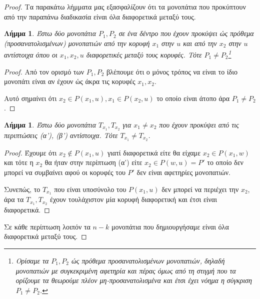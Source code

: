 \documentclass[a4paper, oneside, 11pt]{article}
\newtheorem{lm}[thm]{Λήμμα}
\begin{document}
\begin{enumerate}
\begin{proof}
      Τα παρακάτω λήμματα μας εξασφαλίζουν ότι τα μονοπάτια που προκύπτουν
      από την παραπάνω διαδικασία είναι όλα διαφορετικά μεταξύ τους.

      \begin{lm}
         Έστω δύο μονοπάτια $P_1, P_2$ σε ένα δέντρο που έχουν προκύψει ώς
         πρόθεμα (προσανατολισμένων) μονοπατιών από την κορυφή $x_1$ στην $u$ και
         από την $x_2$ στην $u$ αντίστοιχα όπου οι $x_1, x_2, u$ διαφορετικές
         μεταξύ τους κορυφές. Τότε $P_1 \neq P_2$\footnote{Ορίσαμε τα $P_1, P_2$
         ώς πρόθεμα προσανατολισμένων μονοπατιών, δηλαδή μονοπατιών
         με συγκεκριμένη αφετηρία και πέρας όμως από τη στιγμή που τα ορίζουμε
         τα θεωρούμε πλέον μη-προσανατολισμένα και έτσι έχει νόημα η σύγκριση
         $P_1 \neq P_2$.}
      \end{lm}
      \begin{proof}
         Από τον ορισμό των $P_1, P_2$ βλέπουμε ότι ο μόνος τρόπος να
         είναι το ίδιο μονοπάτι είναι αν έχουν ώς άκρα τις κορυφές
         $x_1, x_2$.

         Αυτό σημαίνει ότι $x_2 \in P(x_1, u), x_1 \in P(x_2, u)$ το οποίο
         είναι άτοπο άρα $P_1 \neq P_2$.
      \end{proof}

      \begin{lm}
      Έστω δύο μονοπάτια $T_{x_1}, T_{x_2}$ για $x_1 \neq x_2$ που έχουν προκύψει
      από τις περιπτώσεις (α'), (β') αντίστοιχα. Τότε $T_{x_1} \neq T_{x_2}$.
      \end{lm}

      \begin{proof}
      Έχουμε ότι
      $x_2 \notin P(x_1, u)$ γιατί διαφορετικά είτε θα είχαμε
      $x_2 \in P(x_1, w)$ και τότε η $x_2$ θα ήταν στην περίπτωση (α') είτε
      $x_2 \in P(w, u) = P'$ το οποίο
      δεν μπορεί να συμβαίνει αφού οι κορυφές του $P'$ δεν είναι αφετηρίες
      μονοπατιών.

      Συνεπώς, το $T_{x_1}$ που είναι υποσύνολο του $P(x_1, u)$ δεν μπορεί
      να περιέχει την $x_2$, άρα τα $T_{x_1}, T_{x_2}$ έχουν τουλάχιστον
      μία κορυφή διαφορετική και έτσι είναι διαφορετικά.
      \end{proof}

      Σε κάθε περίπτωση λοιπόν τα $n-k$ μονοπάτια που δημιουργήσαμε
      είναι όλα διαφορετικά μεταξύ τους.
      \end{proof}
\end{enumerate}
\end{document}
